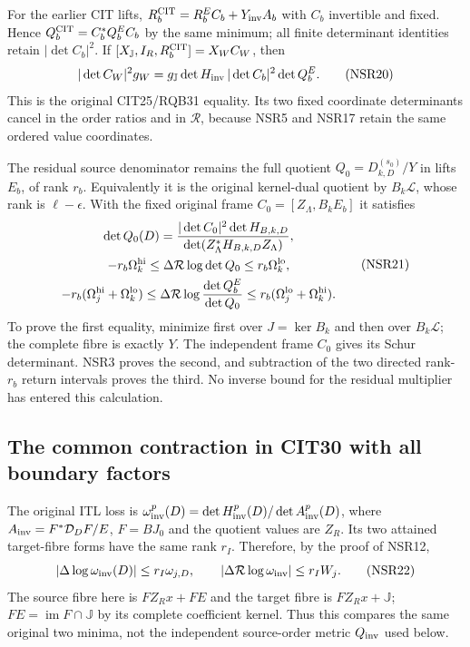 \documentclass[11pt,a4paper]{article}
\begin{document}
For the earlier CIT lifts,
$R_b^{\rm CIT}=R_b^EC_b+Y_{\rm inv}A_b$ with $C_b$
invertible and fixed. Hence
$Q_b^{\rm CIT}=C_b^*Q_b^EC_b$ by the same minimum;
all finite determinant identities retain $|\det C_b|^2$.
If $[X_{\mathbb J},I_R,R_b^{\rm CIT}]=X_WC_W$, then
\[
 |\det C_W|^2g_W
   =g_{\mathbb J}\det H_{\rm inv}\,
                   |\det C_b|^2\det Q_b^E.
 \tag{NSR20}
\]
This is the original CIT25/RQB31 equality. Its two fixed
coordinate determinants cancel in the order ratios and
in $\mathcal R$, because NSR5 and NSR17 retain the
same ordered value coordinates.

The residual source denominator remains the full
quotient $Q_0=D_{k,D}^{(s_0)}/Y$ in lifts $E_b$,
of rank $r_b$. Equivalently it is the original
kernel-dual quotient by $B_k\mathscr L$, whose rank is
$\ell-\epsilon$. With the fixed original frame
$C_0=[Z_\Lambda,B_kE_b]$ it satisfies
\[
 \begin{gathered}
 \det Q_0(D)
  =\frac{|\det C_0|^2\det H_{B,k,D}}
             {\det(Z_\Lambda^*H_{B,k,D}Z_\Lambda)},\\
 -r_b\Omega_k^{\rm hi}\le
             \Delta\mathcal R\log\det Q_0
                    \le r_b\Omega_k^{\rm lo},\\
 -r_b(\Omega_j^{\rm hi}+\Omega_k^{\rm lo})
   \le\Delta\mathcal R\log\frac{\det Q_b^E}{\det Q_0}
   \le r_b(\Omega_j^{\rm lo}+\Omega_k^{\rm hi}).
 \end{gathered}\tag{NSR21}
\]
To prove the first equality, minimize first over
$J=\ker B_k$ and then over $B_k\mathscr L$; the complete
fibre is exactly $Y$. The independent frame $C_0$
gives its Schur determinant. NSR3 proves the second,
and subtraction of the two directed rank-$r_b$ return
intervals proves the third. No inverse bound for the
residual multiplier has entered this calculation.

\subsection{The common contraction in CIT30 with all boundary factors}
The original ITL loss is
$\omega_{\rm inv}^p(D)=\det H_{\rm inv}^p(D)/
\det A_{\rm inv}^p(D)$, where
$A_{\rm inv}=F^*\mathcal D_DF/E$,
$F=BJ_0$ and the quotient values are $Z_R$.
Its two attained target-fibre forms have the same
rank $r_I$. Therefore, by the proof of NSR12,
\[
 \left|\Delta\log\omega_{\rm inv}(D)\right|
        \le r_I\omega_{j,D},\qquad
 \left|\Delta\mathcal R\log\omega_{\rm inv}\right|\le r_IW_j .
 \tag{NSR22}
\]
The source fibre here is $FZ_Rx+F E$ and the target fibre
is $FZ_Rx+\mathbb J$; $FE=\operatorname{im}F\cap\mathbb J$
by its complete coefficient kernel. Thus this compares
the same original two minima, not the independent
source-order metric $Q_{\rm inv}$ used below.
\end{document}
